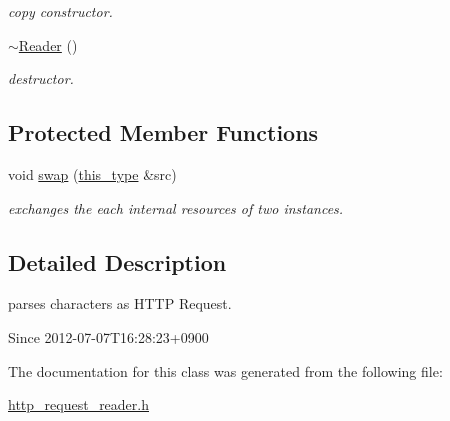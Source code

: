 \begin{DoxyCompactItemize}
\begin{DoxyCompactList}\small\item\em copy constructor. \end{DoxyCompactList}\item 
\hypertarget{classhryky_1_1http_1_1request_1_1_reader_a7f55db52c93dd2c73f40f72c881c2ad5}{\hyperlink{classhryky_1_1http_1_1request_1_1_reader_a7f55db52c93dd2c73f40f72c881c2ad5}{$\sim$\-Reader} ()}\label{classhryky_1_1http_1_1request_1_1_reader_a7f55db52c93dd2c73f40f72c881c2ad5}

\begin{DoxyCompactList}\small\item\em destructor. \end{DoxyCompactList}\end{DoxyCompactItemize}
\subsection*{Protected Member Functions}
\begin{DoxyCompactItemize}
\item 
\hypertarget{classhryky_1_1http_1_1request_1_1_reader_afc16320249f2234208c6c5d5e2c80aac}{void \hyperlink{classhryky_1_1http_1_1request_1_1_reader_afc16320249f2234208c6c5d5e2c80aac}{swap} (\hyperlink{classhryky_1_1http_1_1request_1_1_reader_a44528b6e5afc2cadb7f22b54f2ded317}{this\-\_\-type} \&src)}\label{classhryky_1_1http_1_1request_1_1_reader_afc16320249f2234208c6c5d5e2c80aac}

\begin{DoxyCompactList}\small\item\em exchanges the each internal resources of two instances. \end{DoxyCompactList}\end{DoxyCompactItemize}


\subsection{Detailed Description}
parses characters as H\-T\-T\-P Request. 

\begin{DoxySince}{Since}
2012-\/07-\/07\-T16\-:28\-:23+0900 
\end{DoxySince}


The documentation for this class was generated from the following file\-:\begin{DoxyCompactItemize}
\item 
\hyperlink{http__request__reader_8h}{http\-\_\-request\-\_\-reader.\-h}\end{DoxyCompactItemize}
